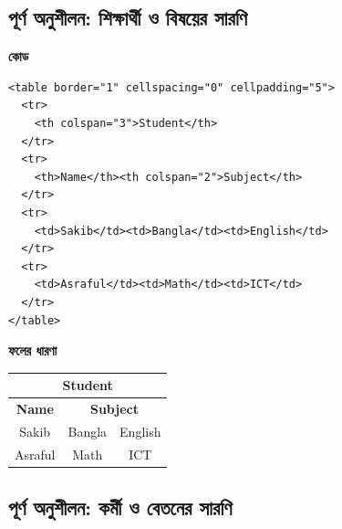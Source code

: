 \subsection{পূর্ণ অনুশীলন: শিক্ষার্থী ও বিষয়ের সারণি}

\par\noindent
\begin{minipage}[t]{.54\linewidth}\vspace{0pt}\small
\textbf{\color{chFourTeal}কোড}\par
\begin{verbatim}
<table border="1" cellspacing="0" cellpadding="5">
  <tr>
    <th colspan="3">Student</th>
  </tr>
  <tr>
    <th>Name</th><th colspan="2">Subject</th>
  </tr>
  <tr>
    <td>Sakib</td><td>Bangla</td><td>English</td>
  </tr>
  <tr>
    <td>Asraful</td><td>Math</td><td>ICT</td>
  </tr>
</table>
\end{verbatim}
\par\smallskip
\end{minipage}\hfill
\begin{minipage}[t]{.42\linewidth}\vspace{0pt}\small
\textbf{\color{chFourTeal}ফলের ধারণা}\par
\begin{center}
\begin{tabular}{|c|c|c|}
\hline
\multicolumn{3}{|c|}{\textbf{Student}} \\
\hline
\textbf{Name} & \multicolumn{2}{c|}{\textbf{Subject}} \\
\hline
Sakib & Bangla & English \\
\hline
Asraful & Math & ICT \\
\hline
\end{tabular}
\end{center}
\par\smallskip
\end{minipage}\par


\subsection{পূর্ণ অনুশীলন: কর্মী ও বেতনের সারণি}

